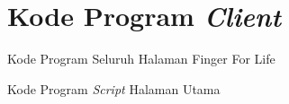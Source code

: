 \chapter{Kode Program \textit{Client}}
\label{lamp:C}

%
%
%

Kode Program Seluruh Halaman Finger For Life


Kode Program \textit{Script} Halaman Utama
